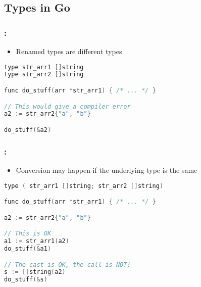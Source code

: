 \subsection{Types in Go}

\begin{frame}[fragile]
    \frametitle{\secname: \small\subsecname\normalsize}

    \begin{itemize}
        \item Renamed types are different types
    \end{itemize}

    \small \begin{lstlisting}[language=c]
type str_arr1 []string
type str_arr2 []string

func do_stuff(arr *str_arr1) { /* ... */ }

// This would give a compiler error
a2 := str_arr2{"a", "b"}

do_stuff(&a2)
    \end{lstlisting} \normalsize
\end{frame}

\begin{frame}[fragile]
    \frametitle{\secname: \small\subsecname\normalsize}

    \begin{itemize}
        \item Conversion may happen if the underlying type is the same
    \end{itemize}

    \small \begin{lstlisting}[language=c]
type ( str_arr1 []string; str_arr2 []string)

func do_stuff(arr *str_arr1) { /* ... */ }

a2 := str_arr2{"a", "b"}

// This is OK
a1 := str_arr1(a2)
do_stuff(&a1)

// The cast is OK, the call is NOT!
s := []string(a2)
do_stuff(&s)
    \end{lstlisting} \normalsize
\end{frame}

